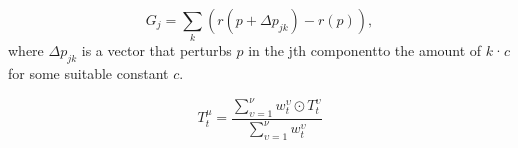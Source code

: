 \documentclass[12pt]{spieman}
\begin{document}
\begin{spacing}{2}
\begin{equation}
    G_{j} = \sum\limits_{k} (r(p+\Delta p_{jk})-r(p)),
    \label{eq5}
\end{equation}
where $\Delta p_{jk}$ is a vector that perturbs $p$ in the jth componentto the amount of $k$·$c$ for some suitable constant $c$.


\begin{equation}
    T^{\mu}_{t} = \frac{\sum_{\upsilon=1}^\nu w^{\upsilon}_{t} \odot T^{\upsilon}_{t}}{\sum_{\upsilon=1}^\nu w^{\upsilon}_{t}}
\end{equation}


\end{spacing}
\end{document}
